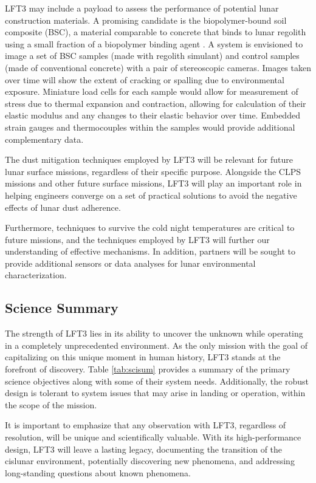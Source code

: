 LFT3 may include a payload to assess the performance of potential lunar construction materials.  A promising candidate is the biopolymer-bound soil composite (BSC), a material comparable to concrete that binds to lunar regolith using a small fraction of a biopolymer binding agent \citep{jrm.2020.09844}. A system is envisioned to image a set of BSC samples (made with regolith simulant) and control samples (made of conventional concrete) with a pair of stereoscopic cameras.  Images taken over time will show the extent of cracking or spalling due to environmental exposure.  Miniature load cells for each sample would allow for measurement of stress due to thermal expansion and contraction, allowing for calculation of their elastic modulus and any changes to their elastic behavior over time.  Embedded strain gauges and thermocouples within the samples would provide additional complementary data.

The dust mitigation techniques employed by LFT3 will be relevant for future lunar surface missions, regardless of their specific purpose.  Alongside the CLPS missions and other future surface missions, LFT3 will play an important role in helping engineers converge on a set of practical solutions to avoid the negative effects of lunar dust adherence.

Furthermore, techniques to survive the cold night temperatures are critical to future missions, and the techniques employed by LFT3 will further our understanding of effective mechanisms.  In addition, partners will be sought to provide additional sensors or data analyses for lunar environmental characterization.

\subsection{Science Summary}
The strength of LFT3 lies in its ability to uncover the unknown while operating in a completely unprecedented environment. As the only mission with the goal of capitalizing on this unique moment in human history, LFT3 stands at the forefront of discovery.  Table \ref{tab:scisum} provides a summary of the primary science objectives along with some of their system needs.  Additionally, the robust design is tolerant to system issues that may arise in landing or operation, within the scope of the mission.

It is important to emphasize that any observation with LFT3, regardless of resolution, will be unique and scientifically valuable.  With its high-performance design, LFT3 will leave a lasting legacy, documenting the transition of the cislunar environment, potentially discovering new phenomena, and addressing long-standing questions about known phenomena. 


